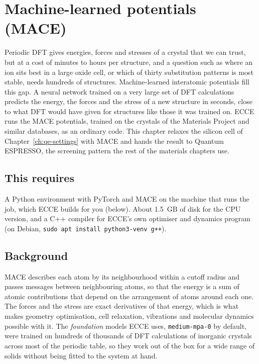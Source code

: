 \chapter{Machine-learned potentials (MACE)}
\label{ch:mlp}

Periodic DFT gives energies, forces and stresses of a crystal that we can trust, but at a cost of minutes to hours per structure, and a question such as where an ion sits best in a large oxide cell, or which of thirty substitution patterns is most stable, needs hundreds of structures. Machine-learned interatomic potentials fill this gap. A neural network trained on a very large set of DFT calculations predicts the energy, the forces and the stress of a new structure in seconds, close to what DFT would have given for structures like those it was trained on. ECCE runs the MACE potentials, trained on the crystals of the Materials Project and similar databases, as an ordinary code. This chapter relaxes the silicon cell of Chapter~\ref{ch:qe-settings} with MACE and hands the result to Quantum ESPRESSO, the screening pattern the rest of the materials chapters use.

\section*{This requires}
A Python environment with PyTorch and MACE on the machine that runs the job, which ECCE builds for you (below). About 1.5~GB of disk for the CPU version, and a C++ compiler for ECCE's own optimiser and dynamics program (on Debian, \texttt{sudo apt install python3-venv g++}).

\section{Background}
MACE describes each atom by its neighbourhood within a cutoff radius and passes messages between neighbouring atoms, so that the energy is a sum of atomic contributions that depend on the arrangement of atoms around each one. The forces and the stress are exact derivatives of that energy, which is what makes geometry optimisation, cell relaxation, vibrations and molecular dynamics possible with it. The \emph{foundation} models ECCE uses, \texttt{medium-mpa-0} by default, were trained on hundreds of thousands of DFT calculations of inorganic crystals across most of the periodic table, so they work out of the box for a wide range of solids without being fitted to the system at hand.

